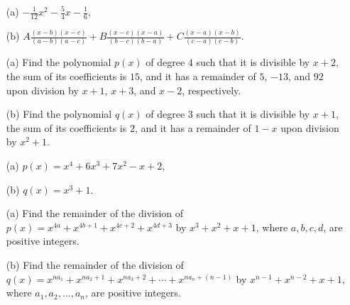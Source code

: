 \begin{solution}[name=Solution by Parviz Shahriari]
\begin{itemize}
    \item[(a)] $\displaystyle -\frac{1}{12}x^2-\frac{5}{4}x-\frac{1}{6}$,
    \item[(b)] $\displaystyle  A\frac{(x-b)(x-c)}{(a-b)(a-c)} + B\frac{(x-c)(x-a)}{(b-c)(b-a)} + C\frac{(x-a)(x-b)}{(c-a)(c-b)}$.
\end{itemize}
\end{solution}




\begin{tcolorbox}
\begin{question}
\begin{itemize}
    \item[(a)] Find the polynomial $p(x)$ of degree $4$ such that it is divisible by $x+2$, the sum of its coefficients is $15$, and it has a remainder of $5$, $-13$, and $92$ upon division by $x+1$, $x+3$, and $x-2$, respectively.
    \item[(b)] Find the polynomial $q(x)$ of degree $3$ such that it is divisible by $x+1$, the sum of its coefficients is $2$, and it has a remainder of $1-x$ upon division by $x^2+1$.
\end{itemize}
\end{question}
\end{tcolorbox}

\begin{solution}[name=Solution by Parviz Shahriari]
\begin{itemize}
    \item[(a)] $p(x)=x^4+6x^3+7x^2-x+2$,
    \item[(b)] $q(x)=x^3+1$.
\end{itemize}
\end{solution}



\begin{tcolorbox}
\begin{question}
\begin{itemize}
    \item[(a)] Find the remainder of the division of $p(x)=x^{4a} + x^{4b+1} + x^{4c+2} + x^{4d+3}$ by $x^3+x^2+x+1$, where $a,b,c,d$, are positive integers.
    \item[(b)] Find the remainder of the division of $q(x)=x^{na_1} + x^{na_2+1} + x^{na_{3}+2} + \cdots + x^{na_{n}+(n-1)}$ by $x^{n-1}+x^{n-2}+x+1$, where $a_1,a_2,\dots,a_n$, are positive integers.
\end{itemize}
\end{question}
\end{tcolorbox}

